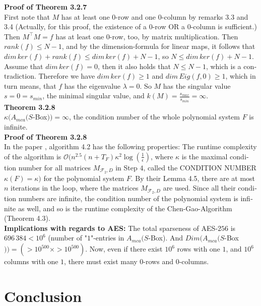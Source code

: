 \documentclass[a4paper,11pt]{article}
\begin{document}
\begin{otherlanguage}{english}
\noindent
\textbf{Proof of Theorem 3.2.7} \\
First note that $M$ has at least one $0$-row and one $0$-column by remarks 3.3 and 3.4 (Actually, for this proof, the existence of a $0$-row OR a $0$-column is sufficient.) Then $M^\intercal M = f$ has at least one $0$-row, too, by matrix multiplication. Then $rank(f) \leq N-1$, and by the dimension-formula for linear maps, it follows that $dim \,ker(f) + rank(f) \leq dim \,ker(f) + N-1$, so $N \leq dim \,ker(f) + N-1$.\\
Assume that $dim \,ker(f) = 0$, then it also holds that $N \leq N-1$, which is a contradiction. Therefore we have $dim \,ker(f) \geq 1$ and  $dim \,Eig(f,0) \geq 1$, 
which in turn means, that $f$ has the eigenvalue $\lambda = 0$. So $M$ has the singular value $s = 0 = s_{min}$, the minimal singular value, and
$k(M ) = \frac{s_{max}}{s_{min}} = \infty$. \\

\noindent
\textbf{Theorem 3.2.8} \\
$\kappa(A_{mca}(S$-Box$))=\infty$, the condition number of the whole polynomial system $F$ is infinite. \\

\noindent
\textbf{Proof of Theorem 3.2.8} \\
In the paper \cite{QAA}, algorithm 4.2 has the following properties: The runtime complexity of the algorithm is  $\mathcal{O}(n^{2.5}(n + T_F)\kappa^2 \log(\frac{1}{\epsilon})$, where $\kappa$ is the maximal condition number for all matrices $M_{\mathcal{F}_2,D}$ in Step $4$, called the CONDITION NUMBER $\kappa(F) = \kappa)$ for the polynomial system $F$. By their Lemma 4.5, there are at most $n$ iterations in the loop, where the matrices $M_{\mathcal{F}_2,D}$ are used. Since all their condition numbers are infinite, the condition number of the polynomial system is infinite as well, and so is the runtime complexity of the Chen-Gao-Algorithm (Theorem 4.3). \\

\noindent
\textbf{Implications with regards to \textsc{AES}:}
The total sparseness of \textsc{AES}-$256$ is $696\,384 < 10^6$ (number of "$1$"-entries in $A_{mca}(S$-Box). And $Dim(A_{mca}(S$-Box$)) = (> 10^{500} \times > 10^{500})$. Now, even if there exist $10^6$ rows with one $1$, and $10^6$ columns with one $1$, there must exist many $0$-rows and $0$-columns. \\ 


\section{Conclusion}


\end{otherlanguage}
\end{document}
